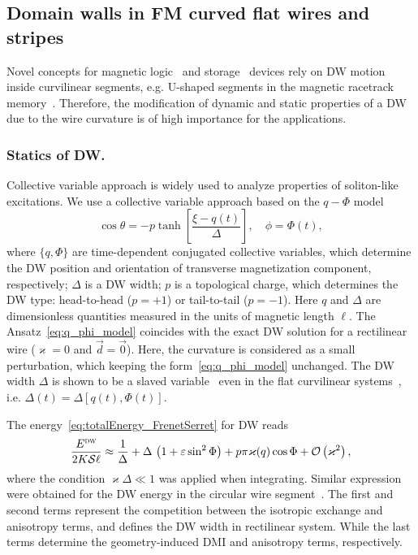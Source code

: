 \subsection{Domain walls in FM curved flat wires and stripes}\label{sec:DW_dyn}

Novel concepts for magnetic logic~\cite{Allwood05} and storage~\cite{Parkin08} devices rely on DW motion inside curvilinear segments, e.g. U-shaped segments in the magnetic racetrack memory~\cite{Parkin08}. Therefore, the modification of dynamic and static properties of a DW due to the wire curvature is of high importance for the applications.

\subsubsection*{Statics of DW.} Collective variable approach is widely used to analyze properties of soliton-like excitations. We use a collective variable approach based on the $q-\Phi$ model~\cite{Slonczewski72,Malozemoff79}
\begin{equation}\label{eq:q_phi_model}
\cos\theta=-p\tanh\left[\frac{\xi-q(t)}{\Delta}\right],\quad\phi=\Phi(t),
\end{equation}
where $\{q, \Phi\}$ are time-dependent conjugated collective variables, which determine the DW position and orientation of transverse magnetization component, respectively; $\Delta$ is a DW width; $p$ is a topological charge, which determines the DW type: head-to-head ($p = +1$) or tail-to-tail ($p = -1$). Here $q$ and $\Delta$ are dimensionless quantities measured in the units of magnetic length $\ell$. The Ansatz~\eqref{eq:q_phi_model} coincides with the exact DW solution for a rectilinear wire ($\varkappa=0$ and $\vec{d}=\vec{0}$). Here, the curvature is considered as a small perturbation, which keeping the form~\eqref{eq:q_phi_model} unchanged. The DW width $\Delta$ is shown to be a slaved variable~\cite{Hillebrands06} even in the flat curvilinear systems~\cite{Yershov18a}, i.e. $\Delta(t) = \Delta\left[q(t),\Phi(t)\right]$.

The energy~\eqref{eq:totalEnergy_FrenetSerret} for DW reads
\begin{equation}\label{eq:dw_energy}
	\frac{E^\textsc{dw}}{2K\mathcal{S}\ell}\approx\frac{1}{\Delta}+\Delta\,\left(1+\varepsilon\sin^2\Phi\right)+p\pi\varkappa(q)\cos\Phi+\mathcal{O}\left(\varkappa^2\right),
\end{equation}
where the condition $\varkappa\Delta\ll1$ was applied when integrating. Similar expression were obtained for the DW energy in the circular wire segment~\cite{Kruger07a}. The first and second terms represent the competition between the isotropic exchange and anisotropy terms, and defines the DW width in rectilinear system. While the last terms determine the geometry-induced DMI and anisotropy terms, respectively.

